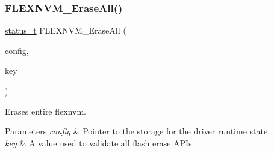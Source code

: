 \subsubsection{\texorpdfstring{FLEXNVM\_EraseAll()}{FLEXNVM\_EraseAll()}}
{\footnotesize\ttfamily \mbox{\hyperlink{group__ksdk__common_gaaabdaf7ee58ca7269bd4bf24efcde092}{status\+\_\+t}} F\+L\+E\+X\+N\+V\+M\+\_\+\+Erase\+All (\begin{DoxyParamCaption}\item[{\mbox{\hyperlink{group__ftfx__flexnvm__driver_ga8fd4d473c0a4b30cac163160fb28a6c1}{flexnvm\+\_\+config\+\_\+t}} $\ast$}]{config,  }\item[{uint32\+\_\+t}]{key }\end{DoxyParamCaption})}



Erases entire flexnvm. 


\begin{DoxyParams}{Parameters}
{\em config} & Pointer to the storage for the driver runtime state. \\
\hline
{\em key} & A value used to validate all flash erase A\+P\+Is.\\
\hline
\end{DoxyParams}

